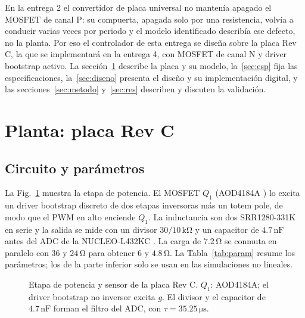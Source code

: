 \documentclass[conference,letterpaper]{IEEEtran}
\newcommand{\unit}[1]{\,\mathrm{#1}}
\begin{document}
En la entrega 2 \cite{e2} el convertidor de placa universal no mantenía apagado el MOSFET de canal P: su compuerta, apagada solo por una resistencia, volvía a conducir varias veces por periodo y el modelo identificado describía ese defecto, no la planta. Por eso el controlador de esta entrega se diseña sobre la placa Rev C, la que se implementará en la entrega 4, con MOSFET de canal N y driver bootstrap activo. La sección~\ref{sec:planta} describe la placa y su modelo, la~\ref{sec:esp} fija las especificaciones, la~\ref{sec:diseno} presenta el diseño y su implementación digital, y las secciones~\ref{sec:metodo} y~\ref{sec:res} describen y discuten la validación.

\section{Planta: placa Rev C}\label{sec:planta}
\subsection{Circuito y parámetros}
La Fig.~\ref{fig:circuito} muestra la etapa de potencia. El MOSFET $Q_1$ (AOD4184A \cite{aod}) lo excita un driver bootstrap discreto de dos etapas inversoras más un totem pole, de modo que el PWM en alto enciende $Q_1$. La inductancia son dos SRR1280-331K \cite{srr} en serie y la salida se mide con un divisor $30/10\unit{k\Omega}$ y un capacitor de $4.7\unit{nF}$ antes del ADC de la NUCLEO-L432KC \cite{um1956}. La carga de $7.2\unit{\Omega}$ se conmuta en paralelo con $36$ y $24\unit{\Omega}$ para obtener $6$ y $4.8\unit{\Omega}$. La Tabla~\ref{tab:param} resume los parámetros; los de la parte inferior solo se usan en las simulaciones no lineales.

\begin{figure}[H]\centering{}\caption{Etapa de potencia y sensor de la placa Rev C. $Q_1$: AOD4184A; el driver bootstrap no inversor excita $g$. El divisor y el capacitor de $4.7\unit{nF}$ forman el filtro del ADC, con $\tau=35.25\unit{\mu s}$.}\label{fig:circuito}\end{figure}
\end{document}
